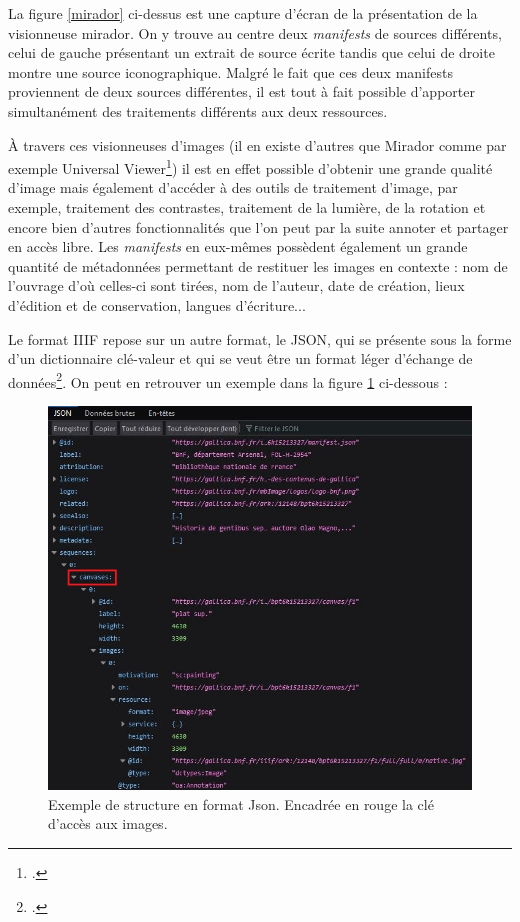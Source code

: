\documentclass[a4paper,12pt,twoside]{book}
\begin{document}
La figure \ref{mirador} ci-dessus est une capture d'écran de la présentation de la visionneuse mirador. On y trouve au centre deux \textit{manifests} de sources différents, celui de gauche présentant un extrait de source écrite tandis que celui de droite montre une source iconographique. Malgré le fait que ces deux manifests proviennent de deux sources différentes, il est tout à fait possible d'apporter simultanément des traitements différents aux deux ressources.


À travers ces visionneuses d'images (il en existe d'autres que Mirador comme par exemple Universal Viewer\footcite{universal}) il est en effet possible d'obtenir une grande qualité d'image mais également d'accéder à des outils de traitement d'image, par exemple, traitement des contrastes, traitement de la lumière, de la rotation et encore bien d'autres fonctionnalités que l'on peut par la suite annoter et partager en accès libre. Les \textit{manifests} en eux-mêmes possèdent également un grande quantité de métadonnées permettant de restituer les images en contexte : nom de l'ouvrage d'où celles-ci sont tirées, nom de l'auteur, date de création, lieux d'édition et de conservation, langues d'écriture...


Le format \acrshort{IIIF} repose sur un autre format, le \acrfull{JSON}, qui se présente sous la forme d'un \og dictionnaire clé-valeur\fg{} et qui se veut être un format léger d'échange de données\footcite{json}. On peut en retrouver un exemple dans la figure \ref{json} ci-dessous :

\begin{figure}[H]
    \centering
    \includegraphics[width=12cm]{img/partie_3/json.JPG}
    \caption{Exemple de structure en format Json. Encadrée en rouge la clé d'accès aux images.}
    \label{json}
\end{figure}
\end{document}

